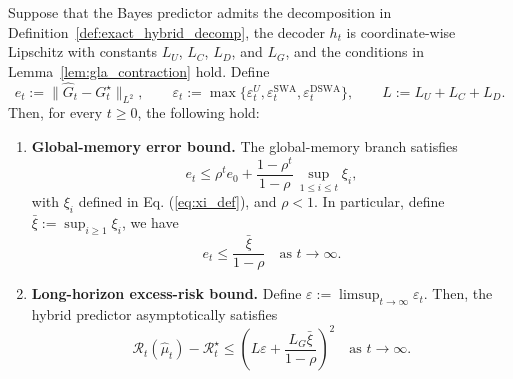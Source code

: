 \documentclass{llmxive}
\begin{document}
\begin{theorem}
\label{thm:kairos_sufficiency}
Suppose that the Bayes predictor admits the decomposition in Definition~\ref{def:exact_hybrid_decomp}, the decoder $h_t$ is coordinate-wise Lipschitz with constants $L_U$, $L_C$, $L_D$, and $L_G$, and the conditions in Lemma~\ref{lem:gla_contraction} hold. Define
\begin{equation}
e_t := \|\hat G_t-G_t^\star\|_{L^2}, \qquad
\varepsilon_t := \max\!\bigl\{\varepsilon_t^U,\varepsilon_t^{\mathrm{SWA}},\varepsilon_t^{\mathrm{DSWA}}\bigr\},
\qquad
L := L_U+L_C+L_D .
\label{eq:et_eps_def}
\end{equation}
Then, for every $t\ge 0$, the following hold:
\begin{enumerate}
    \item[\textup{(i)}] \textbf{Global-memory error bound.}
   The global-memory branch satisfies
\begin{equation}
    e_t \le \rho^t e_0 + \frac{1-\rho^t}{1-\rho}\, \sup_{1\le i\le t}\xi_i,
    \label{eq:main_memory_bound}
\end{equation}
with $\xi_i$ defined in Eq. (\ref{eq:xi_def}), and $\rho<1$. 
In particular, define $\bar\xi :=  \sup_{i\ge 1}\xi_i$,  we have
\begin{equation}
    e_t \le \frac{\bar\xi}{1-\rho} \quad \text{as } t \to \infty.
    \label{eq:main_memory_limsup}
\end{equation}

   \item[\textup{(ii)}] \textbf{Long-horizon excess-risk bound.}
    Define $\varepsilon := \limsup_{t\to\infty} \varepsilon_t$. Then, the hybrid predictor asymptotically satisfies
    \begin{equation}
    \mathcal R_t(\hat\mu_t)-\mathcal R_t^\star 
    \le
    \left(
    L \varepsilon
    +
    \frac{L_G \bar\xi}{1-\rho}
    \right)^2 \quad \text{as } t \to \infty.
    \label{eq:main_risk_bound_infty}
    \end{equation}
\end{enumerate}
\end{theorem}
\end{document}
